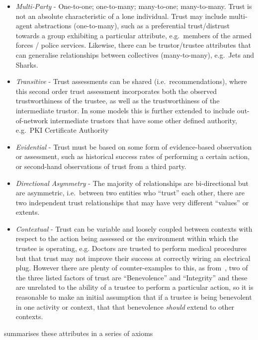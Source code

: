 \begin{itemize}
	\item \emph{Multi-Party} - One-to-one; one-to-many; many-to-one; many-to-many.
	Trust is not an absolute characteristic of a lone individual.
	Trust may include multi-agent abstractions (one-to-many), such as a preferential trust/distrust towards a group exhibiting a particular attribute, e.g.\ members of the armed forces / police services.
	Likewise, there can be trustor/trustee attributes that can generalise relationships between collectives (many-to-many), e.g.\ Jets and Sharks\cite{Robbins1961}.
	\item \emph{Transitive} - Trust assessments can be shared (i.e.\ recommendations), where this second order trust assessment incorporates both the observed trustworthiness of the trustee, as well as the trustworthiness of the intermediate trustor.
	In some models this is further extended to include out-of-network intermediate trustors that have some other defined authority, e.g.\ PKI Certificate Authority
	\item \emph{Evidential} - Trust must be based on some form of evidence-based observation or assessment, such as historical success rates of performing a certain action, or second-hand observations of trust from a third party.
	\item \emph{Directional Asymmetry} - The majority of relationships are bi-directional but are asymmetric, i.e.\ between two entities who ``trust'' each other, there are two independent trust relationships that may have very different ``values'' or extents.
	\item \emph{Contextual} - Trust can be variable and loosely coupled between contexts with respect to the action being assessed or the environment within which the trustee is operating, e.g.
	Doctors are trusted to perform medical procedures but that trust may not improve their success at correctly wiring an electrical plug.
	However there are plenty of counter-examples to this, as from~\cite{Mayer1995}, two of the three listed factors of trust are ``Benevolence'' and ``Integrity'' and these are unrelated to the ability of a trustee to perform a particular action, so it is reasonable to make an initial assumption that if a trustee is being benevolent in one activity or context, that that benevolence \emph{should} extend to other contexts.
\end{itemize}

\citet{Liu2010} summarises these attributes in a series of axioms 

